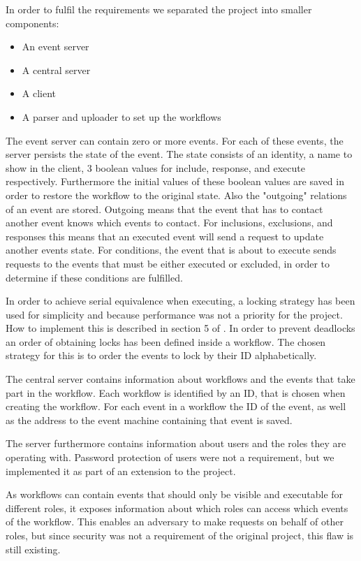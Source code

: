 		\newpar In order to fulfil the requirements we separated the project into smaller components:
		
		\begin{itemize}
			\item An event server
			\item A central server
			\item A client
			\item A parser and uploader to set up the workflows
		\end{itemize}
		
		\newpar The event server can contain zero or more events. For each of these events, the server persists the state of the event. The state consists of an identity, a name to show in the client, 3 boolean values for include, response, and execute respectively. Furthermore the initial values of these boolean values are saved in order to restore the workflow to the original state. Also the "outgoing" relations of an event are stored. Outgoing means that the event that has to contact another event knows which events to contact. For inclusions, exclusions, and responses this means that an executed event will send a request to update another events state. For conditions, the event that is about to execute sends requests to the events that must be either executed or excluded, in order to determine if these conditions are fulfilled.
		
		\newpar In order to achieve serial equivalence when executing, a locking strategy has been used for simplicity and because performance was not a priority for the project. How to implement this is described in section 5 of \cite{debois2015concurrency}. In order to prevent deadlocks an order of obtaining locks has been defined inside a workflow. The chosen strategy for this is to order the events to lock by their ID alphabetically.
		
		\newpar The central server contains information about workflows and the events that take part in the workflow. Each workflow is identified by an ID, that is chosen when creating the workflow. For each event in a workflow the ID of the event, as well as the address to the event machine containing that event is saved.
		
		\newpar The server furthermore contains information about users and the roles they are operating with. Password protection of users were not a requirement, but we implemented it as part of an extension to the project.
		
		\newpar As workflows can contain events that should only be visible and executable for different roles, it exposes information about which roles can access which events of the workflow. This enables an adversary to make requests on behalf of other roles, but since security was not a requirement of the original project, this flaw is still existing.
		
